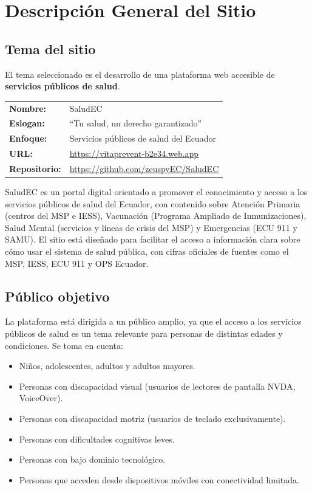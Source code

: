 \documentclass[12pt, a4paper]{article}
\begin{document}
\section{Descripción General del Sitio}

\subsection{Tema del sitio}

El tema seleccionado es el desarrollo de una plataforma web accesible de \textbf{servicios públicos de salud}.

\begin{infobox}
\begin{tabular}{@{}ll@{}}
\textbf{Nombre:}       & SaludEC \\
\textbf{Eslogan:}      & ``Tu salud, un derecho garantizado'' \\
\textbf{Enfoque:}      & Servicios públicos de salud del Ecuador \\
\textbf{URL:}          & \url{https://vitaprevent-b2e34.web.app} \\
\textbf{Repositorio:}  & \url{https://github.com/zeuspyEC/SaludEC} \\
\end{tabular}
\end{infobox}

SaludEC es un portal digital orientado a promover el conocimiento y acceso a los servicios públicos de salud del Ecuador, con contenido sobre Atención Primaria (centros del MSP e IESS), Vacunación (Programa Ampliado de Inmunizaciones), Salud Mental (servicios y líneas de crisis del MSP) y Emergencias (ECU 911 y SAMU). El sitio está diseñado para facilitar el acceso a información clara sobre cómo usar el sistema de salud pública, con cifras oficiales de fuentes como el MSP, IESS, ECU 911 y OPS Ecuador.

\subsection{Público objetivo}

La plataforma está dirigida a un público amplio, ya que el acceso a los servicios públicos de salud es un tema relevante para personas de distintas edades y condiciones. Se toma en cuenta:

\begin{itemize}
  \item Niños, adolescentes, adultos y adultos mayores.
  \item Personas con discapacidad visual (usuarios de lectores de pantalla NVDA, VoiceOver).
  \item Personas con discapacidad motriz (usuarios de teclado exclusivamente).
  \item Personas con dificultades cognitivas leves.
  \item Personas con bajo dominio tecnológico.
  \item Personas que acceden desde dispositivos móviles con conectividad limitada.
\end{itemize}
\end{document}
